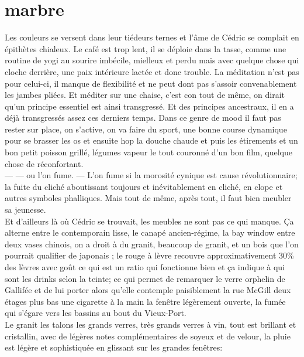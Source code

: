 \clearpage
\section*{marbre}
Les couleurs se versent dans leur tiédeurs ternes et
l'âme de Cédric se complait en épithètes chialeux. Le café est trop lent, il se
déploie dans la tasse, comme une routine de yogi au sourire imbécile, mielleux
et perdu mais avec quelque chose qui cloche derrière, une paix intérieure lactée
et donc trouble. La méditation n'est pas pour celui-ci, il manque de flexibilité
et ne peut dont pas s'assoir convenablement les jambes pliées.  Et méditer sur
une chaise, c'est con tout de même, on dirait qu'un principe essentiel est ainsi
transgressé. Et des principes ancestraux, il en a déjà transgressés assez ces
derniers temps.  Dans ce genre de mood il faut pas rester sur place, on
s'active, on va faire du sport, une bonne course dynamique pour se brasser les
os et ensuite hop la douche chaude et puis les étirements et un bon petit
poisson grillé, légumes vapeur le tout couronné d'un bon film, quelque chose de
réconfortant.  \\--- --- ou l'on fume. --- L'on fume si la morosité cynique est
cause révolutionnaire; la fuite du cliché aboutissant toujours et
inévitablement en cliché, en  clope et autres symboles phalliques.  Mais
tout de même, après tout, il faut bien meubler sa jeunesse. \\

Et d'ailleurs là où Cédric se trouvait, les meubles ne sont pas ce qui manque.
Ça alterne entre le contemporain lisse, le canapé ancien-régime, la bay window
entre deux vases chinois, on a droit à du granit, beaucoup de granit, et un bois
que l'on pourrait qualifier de japonais ; le rouge à lèvre recouvre
approximativement 30\% des lèvres avec goût ce qui est un ratio qui fonctionne
bien et ça indique à qui sont les drinks selon la teinte; ce qui permet de
remarquer le verre orphelin de Gallifée et de lui porter alors qu'elle contemple
paisiblement la rue McGill deux étages plus bas une cigarette à la main la
fenêtre légèrement ouverte, la fumée qui s'égare vers les bassins au bout du Vieux-Port. 
\\Le granit les talons les grands verres, très grands verres à vin, tout est
brillant et cristallin, avec de légères notes complémentaires de soyeux et de
velour, la pluie est légère et sophistiquée en glissant sur les grandes
fenêtres:

